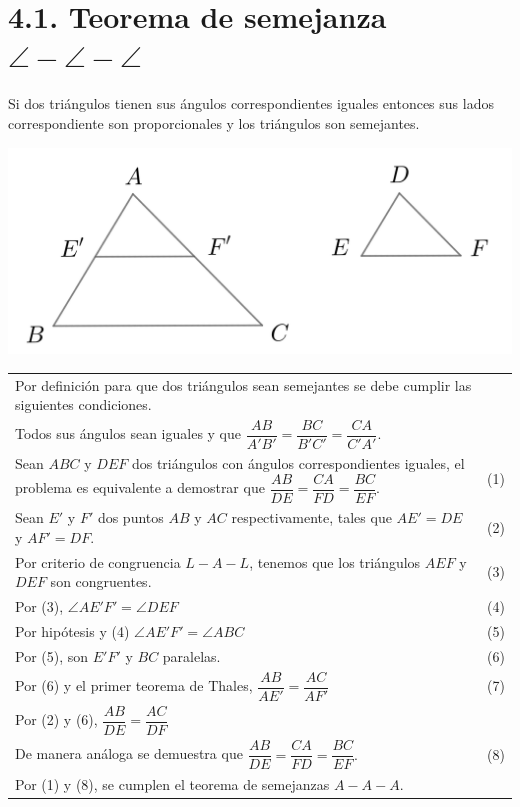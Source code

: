 \documentclass[12pt,a4paper, oneside]{book}
\begin{document}
\section{4.1. Teorema de semejanza $\angle - \angle - \angle$}
Si dos triángulos tienen sus ángulos correspondientes iguales entonces sus lados correspondiente son proporcionales y los triángulos son semejantes.
\\
\begin{center}
\includegraphics[scale=0.8]{Imagenes/semejanza.png} 
\end{center}
\begin{tabular}{p{15.9 cm} p{1cm}}
Por definición para que dos triángulos sean semejantes se debe cumplir las siguientes condiciones.
\\Todos sus ángulos sean iguales y que $\dfrac{AB}{A'B'}=\dfrac{BC}{B'C'}=\dfrac{CA}{C'A'}.$ 
\\Sean $ABC$ y $DEF$ dos triángulos con ángulos correspondientes iguales, el problema es equivalente a demostrar que $\dfrac{AB}{DE}=\dfrac{CA}{FD}=\dfrac{BC}{EF}.$&\medskip (1)
\\Sean $E'$ y $F'$ dos puntos $AB$ y $AC$ respectivamente, tales que $AE'= DE$ y $AF' = DF$. &(2)
\\Por criterio de congruencia $L-A-L$, tenemos que los triángulos $AEF$ y $DEF$ son congruentes.&(3)
\\Por (3), $\angle AE'F' = \angle DEF $ & (4)
\\Por hipótesis y (4) $\angle AE'F'=\angle ABC$ & (5)
\\Por (5), son $E'F'$ y $BC$ paralelas. & (6)
\\Por (6) y el primer teorema de Thales, $\dfrac{AB}{AE'}=\dfrac{AC}{AF'}$ & (7)
\\Por (2) y (6), $\dfrac{AB}{DE}=\dfrac{AC}{DF}$
\\De manera análoga se demuestra que $\dfrac{AB}{DE}=\dfrac{CA}{FD}=\dfrac{BC}{EF}.$ & (8)
\\Por (1) y (8), se cumplen el teorema de semejanzas $A-A-A$.
\end{tabular}
\end{document}
